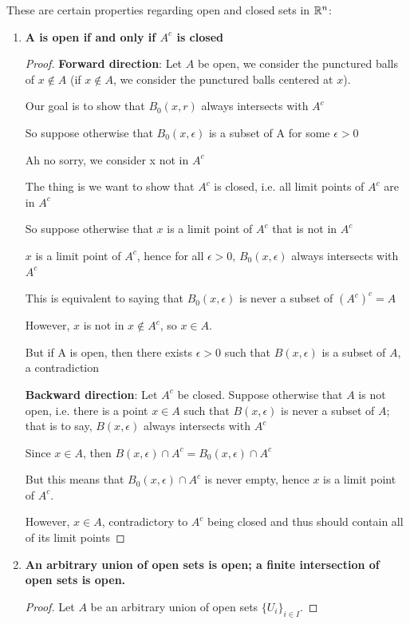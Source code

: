 These are certain properties regarding open and closed sets in $\mathbb R^n$:
\begin{enumerate}[label=\textbf{P\arabic*}]
\item \textbf{A is open if and only if $A^c$ is closed}

\begin{proof}
\textbf{Forward direction}:
Let $A$ be open, we consider the punctured balls of $x \notin A$ (if $x \notin A$, we consider the punctured balls centered at $x$).

Our goal is to show that $B_0(x,r)$ always intersects with $A^c$

So suppose otherwise that $B_0(x,\epsilon)$ is a subset of A for some $\epsilon>0$

Ah no sorry, we consider x not in $A^c$

The thing is we want to show that $A^c$ is closed, i.e. all limit points of $A^c$ are in $A^c$

So suppose otherwise that $x$ is a limit point of $A^c$ that is not in $A^c$

$x$ is a limit point of $A^c$, hence for all $\epsilon>0$, $B_0(x,\epsilon)$ always intersects with $A^c$

This is equivalent to saying that $B_0(x,\epsilon)$ is never a subset of $(A^c)^c=A$

However, $x$ is not in $x \notin A^c$, so $x \in A$.

But if A is open, then there exists $\epsilon>0$ such that $B(x,\epsilon)$ is a subset of $A$, a contradiction

\textbf{Backward direction}: Let $A^c$ be closed. Suppose otherwise that $A$ is not open, i.e. there is a point $x\in A$ such that $B(x,\epsilon)$ is never a subset of $A$; that is to say, $B(x,\epsilon)$ always intersects with $A^c$

Since $x \in A$, then $B(x,\epsilon) \cap A^c = B_0(x,\epsilon) \cap A^c$

But this means that $B_0(x,\epsilon) \cap A^c$ is never empty, hence $x$ is a limit point of $A^c$.

However, $x \in A$, contradictory to $A^c$ being closed and thus should contain all of its limit points
\end{proof}

\item \textbf{An arbitrary union of open sets is open; a finite intersection of open sets is open.}

\begin{proof}
Let $A$ be an arbitrary union of open sets $\{U_i\}_{i \in I}$.


\end{proof}
\end{enumerate}

